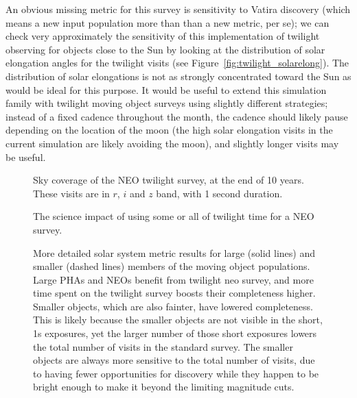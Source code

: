 An obvious missing metric for this survey is sensitivity to Vatira discovery (which means a new input population more than than a new metric, per se); we can check very approximately the sensitivity of this implementation of twilight observing for objects close to the Sun by looking at the distribution of solar elongation angles for the twilight visits (see Figure~\ref{fig:twilight_solarelong}). The distribution of solar elongations is not as strongly concentrated toward the Sun as would be ideal for this purpose. It would be useful to extend this simulation family with twilight moving object surveys using slightly different strategies; instead of a fixed cadence throughout the month, the cadence should likely pause depending on the location of the moon (the high solar elongation visits in the current simulation are likely avoiding the moon), and slightly longer visits may be useful. 

\begin{figure}
\caption{Sky coverage of the NEO twilight survey, at the end of 10 years. These visits are in $r$, $i$ and $z$ band, with 1 second duration.}
\label{fig:sky_twilightneo}
\end{figure}


\begin{figure}
\caption{The science impact of using some or all of twilight time for a NEO survey.}\label{fig:neoradar}
\end{figure}

\begin{figure}
\caption{More detailed solar system metric results for large (solid lines) and smaller (dashed lines) members of the moving object populations. Large PHAs and NEOs benefit from twilight neo survey, and more time spent on the twilight survey boosts their completeness higher. Smaller objects, which are also fainter, have lowered completeness. This is likely because the smaller objects are not visible in the short, 1s exposures, yet the larger number of those short exposures lowers the total number of visits in the standard survey. The smaller objects are always more sensitive to the total number of visits, due to having fewer opportunities for discovery while they happen to be bright enough to make it beyond the limiting magnitude cuts.}
\label{fig:sscompleteness_twilight}
\end{figure}

